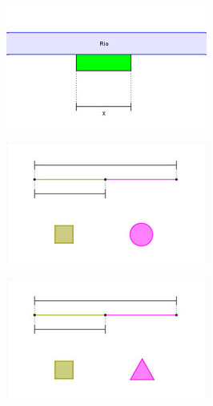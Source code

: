\begin{figure}
    \centering
    
    \begin{subfigure}{0.3\textwidth}
    \centering
    \includegraphics[width=.9\textwidth]{icones-modulos/pot-m-pce.jpg}
    \label{fig:pce-ic}
    \end{subfigure}
    \hfill
    \begin{subfigure}{0.3\textwidth}
    \centering
    \includegraphics[width=.9\textwidth]{icones-modulos/pot-m-pbc.jpg}
    \label{fig:pbc-ic}
    \end{subfigure}
    \hfill
    \begin{subfigure}{0.3\textwidth}
    \centering
    \includegraphics[width=.9\textwidth]{icones-modulos/pot-m-pbt.jpg}
    \label{fig:pbt-ic}
    \end{subfigure}
    

\end{figure}
